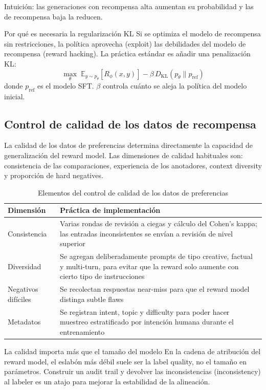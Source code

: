 Intuición: las generaciones con recompensa alta aumentan su probabilidad y las de recompensa baja la reducen.

\begin{warningbox}{Por qué es necesaria la regularización KL}
Si se optimiza el modelo de recompensa sin restricciones, la política aprovecha (exploit) las debilidades del modelo de recompensa (reward hacking). La práctica estándar es añadir una penalización KL:
$$\max_\theta \; \mathbb{E}_{y \sim p_\theta}\left[R_\phi(x, y)\right] - \beta \, D_{\mathrm{KL}}(p_\theta \| p_{\mathrm{ref}})$$
donde $p_{\mathrm{ref}}$ es el modelo SFT. $\beta$ controla cuánto se aleja la política del modelo inicial.
\end{warningbox}

\subsection{Control de calidad de los datos de recompensa}

La calidad de los datos de preferencias determina directamente la capacidad de generalización del reward model. Las dimensiones de calidad habituales son: consistencia de las comparaciones, experiencia de los anotadores, context diversity y proporción de hard negatives.

\begin{table}[H]
\centering
\begin{tabular}{p{} p{}}
\toprule
Dimensión & Práctica de implementación \\
\midrule
Consistencia & Varias rondas de revisión a ciegas y cálculo del Cohen's kappa; las entradas inconsistentes se envían a revisión de nivel superior \\
Diversidad & Se agregan deliberadamente prompts de tipo creative, factual y multi-turn, para evitar que la reward solo aumente con cierto tipo de instrucciones \\
Negativos difíciles & Se recolectan respuestas near-miss para que el reward model distinga subtle flaws \\
Metadatos & Se registran intent, topic y difficulty para poder hacer muestreo estratificado por intención humana durante el entrenamiento \\
\bottomrule
\end{tabular}
\caption{Elementos del control de calidad de los datos de preferencias}
\end{table}

\begin{knowledgebox}{La calidad importa más que el tamaño del modelo}
En la cadena de atribución del reward model, el eslabón más débil suele ser la label quality, no el tamaño en parámetros. Construir un audit trail y devolver las inconsistencias (inconsistency) al labeler es un atajo para mejorar la estabilidad de la alineación.
\end{knowledgebox}

